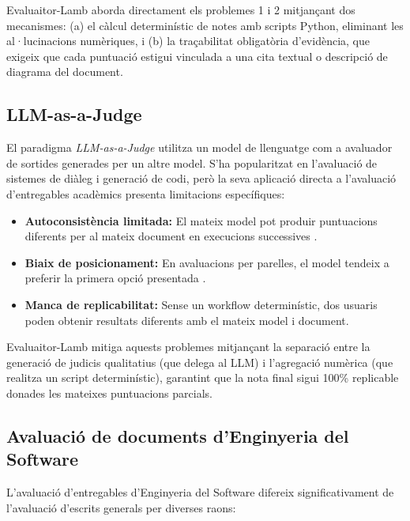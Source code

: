 \documentclass[12pt,a4paper,twoside]{report}
\begin{document}
Evaluaitor-Lamb aborda directament els problemes 1 i 2 mitjan\c{c}ant dos mecanismes: (a) el c\`alcul determin\'istic de notes amb scripts Python, eliminant les al·lucinacions num\`eriques, i (b) la tra\c{c}abilitat obligat\`oria d'evid\`encia, que exigeix que cada puntuaci\'o estigui vinculada a una cita textual o descripci\'o de diagrama del document.

\subsection{LLM-as-a-Judge}
\label{subsec:llm-judge}

El paradigma \textit{LLM-as-a-Judge} \cite{zheng2023} utilitza un model de llenguatge com a avaluador de sortides generades per un altre model. S'ha popularitzat en l'avaluaci\'o de sistemes de di\`aleg i generaci\'o de codi, per\`o la seva aplicaci\'o directa a l'avaluaci\'o d'entregables acad\`emics presenta limitacions espec\'ifiques:

\begin{itemize}
    \item \textbf{Autoconsist\`encia limitada:} El mateix model pot produir puntuacions diferents per al mateix document en execucions successives \cite{zheng2023}.
    \item \textbf{Biaix de posicionament:} En avaluacions per parelles, el model tendeix a preferir la primera opci\'o presentada \cite{zheng2023}.
    \item \textbf{Manca de replicabilitat:} Sense un workflow determin\'istic, dos usuaris poden obtenir resultats diferents amb el mateix model i document.
\end{itemize}

Evaluaitor-Lamb mitiga aquests problemes mitjan\c{c}ant la separaci\'o entre la generaci\'o de judicis qualitatius (que delega al LLM) i l'agregaci\'o num\`erica (que realitza un script determin\'istic), garantint que la nota final sigui 100\% replicable donades les mateixes puntuacions parcials.

\subsection{Avaluaci\'o de documents d'Enginyeria del Software}
\label{subsec:aval-es}

L'avaluaci\'o d'entregables d'Enginyeria del Software difereix significativament de l'avaluaci\'o d'escrits generals per diverses raons:
\end{document}

